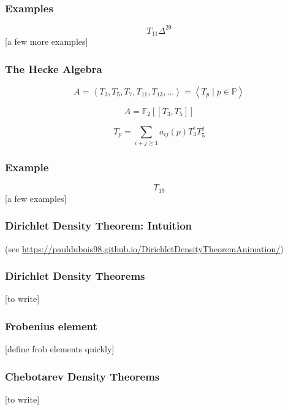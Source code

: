 \documentclass[12pt]{beamer}
\begin{document}
	\begin{frame}
		\frametitle{Examples}
		$$T_{11}\Delta^{29}$$
		[a few more examples]
	\end{frame}

	\begin{frame}
		\frametitle{The Hecke Algebra}
		$$
		A
		= \left\langle T_3, T_5, T_7, T_{11}, T_{13}, \dots  \right\rangle
		= \left\langle T_p \mid p \in \mathbb{P} \right\rangle
		$$
		
		$$A = \mathbb{F}_2 \left[\left[ T_3, T_5 \right]\right]$$
		
		$$T_p = \sum_{i+j \geq 1} a_{ij}(p) T_3^iT_5^j$$
	\end{frame}

	\begin{frame}
		\frametitle{Example}
		$$T_{19}$$
		[a few examples]
	\end{frame}

	\begin{frame}
		\frametitle{Dirichlet Density Theorem: Intuition}
		(see \url{https://pauldubois98.github.io/DirichletDensityTheoremAnimation/})
	\end{frame}
	\begin{frame}
		\frametitle{Dirichlet Density Theorems}
		[to write]
	\end{frame}
	
	\begin{frame}
		\frametitle{Frobenius element}
		[define frob elements quickly]
	\end{frame}
	\begin{frame}
		\frametitle{Chebotarev Density Theorems}
		[to write]
	\end{frame}
\end{document}
